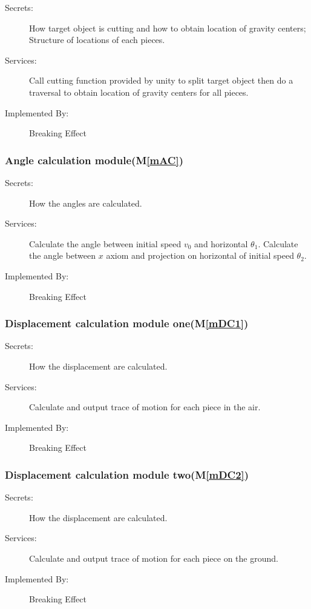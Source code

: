 \documentclass[12pt, titlepage]{article}
\newcommand{\mref}[1]{M\ref{#1}}
\begin{document}
	\begin{description}
		\item[Secrets:]How target object is cutting and how to obtain location of gravity centers; Structure of locations of each pieces.
		\item[Services:]Call cutting function provided by unity to split target object then do a traversal to obtain location of gravity centers for all pieces.
		\item[Implemented By:] Breaking Effect
	\end{description}
	
	\subsubsection{Angle calculation module(\mref{mAC})}
	
	\begin{description}
		\item[Secrets:]How the angles are calculated.
		\item[Services:]Calculate the angle between initial speed $v_{0}$ and horizontal $\theta_{1}$. Calculate the angle between $x$ axiom and projection on horizontal of initial speed $\theta_{2}$.
		\item[Implemented By:] Breaking Effect
	\end{description}
	
	\subsubsection{Displacement calculation module one(\mref{mDC1})}
	
	\begin{description}
		\item[Secrets:]How the displacement are calculated.
		\item[Services:]Calculate and output trace of motion for each piece in the air.
		\item[Implemented By:] Breaking Effect
	\end{description}
	
	\subsubsection{Displacement calculation module two(\mref{mDC2})}
	
	\begin{description}
		\item[Secrets:]How the displacement are calculated.
		\item[Services:]Calculate and output trace of motion for each piece on the ground.
		\item[Implemented By:] Breaking Effect
	\end{description}
	
\end{document}
